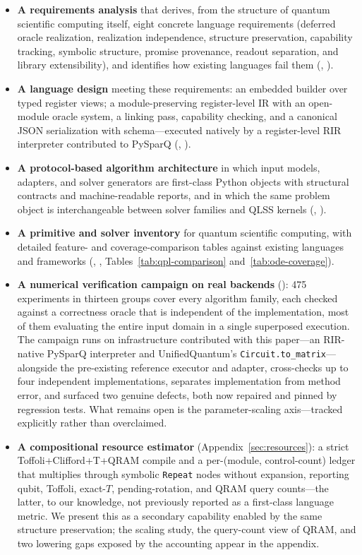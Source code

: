\begin{itemize}
\item \textbf{A requirements analysis} that derives, from the structure of
  quantum scientific computing itself, eight concrete language requirements
  (deferred oracle realization, realization independence, structure
  preservation, capability tracking, symbolic structure, promise provenance,
  readout separation, and library extensibility), and identifies how existing
  languages fail them (, ).
\item \textbf{A language design} meeting these requirements: an embedded
  builder over typed register views; a module-preserving register-level IR
  with an open-module oracle system, a linking pass, capability checking,
  and a canonical JSON serialization with schema---executed natively by a
  register-level RIR interpreter contributed to PySparQ
  (, ).
\item \textbf{A protocol-based algorithm architecture} in which input models,
  adapters, and solver generators are first-class Python objects with
  structural contracts and machine-readable reports, and in which the same
  problem object is interchangeable between solver families and QLSS kernels
  (, ).
\item \textbf{A primitive and solver inventory} for quantum scientific
  computing, with detailed feature- and coverage-comparison tables against
  existing languages and frameworks (,
  , Tables~\ref{tab:qpl-comparison}
  and~\ref{tab:ode-coverage}).
\item \textbf{A numerical verification campaign on real backends}
  (): 475 experiments in thirteen groups cover
  every algorithm family, each checked against a correctness oracle that is
  independent of the implementation, most of them evaluating the entire
  input domain in a single superposed execution.  The campaign runs on
  infrastructure contributed with this paper---an RIR-native PySparQ
  interpreter and UnifiedQuantum's \texttt{Circuit.to\_matrix}---alongside
  the pre-existing reference executor and adapter, cross-checks up to four
  independent implementations, separates implementation from method error,
  and surfaced two genuine defects, both now repaired and pinned by
  regression tests.  What remains open is the parameter-scaling
  axis---tracked explicitly rather than overclaimed.
\item \textbf{A compositional resource estimator}
  (Appendix~\ref{sec:resources}): a strict Toffoli+Clifford+T+QRAM compile
  and a per-(module, control-count) ledger that multiplies through symbolic
  \texttt{Repeat} nodes without expansion, reporting qubit, Toffoli,
  exact-$T$, pending-rotation, and QRAM query counts---the latter, to our
  knowledge, not previously reported as a first-class language
  metric.  We present this as a secondary capability enabled by the same
  structure preservation; the scaling study, the query-count view of QRAM,
  and two lowering gaps exposed by the accounting appear in the appendix.
\end{itemize}

